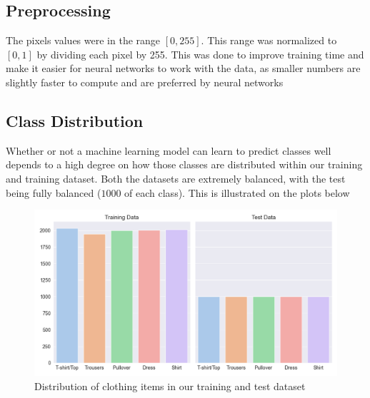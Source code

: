 \subsection{Preprocessing}\label{subsec:preprocessing}
The pixels values were in the range $[0, 255]$.
This range was normalized to $[0, 1]$ by dividing each pixel by 255.
This was done to improve training time and make it easier for neural networks to work with the data, as smaller numbers are slightly faster to compute and are preferred by neural networks


\subsection{Class Distribution}\label{subsec:class-distribution}
Whether or not a machine learning model can learn to predict classes well depends to a high degree on how those classes are distributed within our training and training dataset.
Both the datasets are extremely balanced, with the test being fully balanced ($1000$ of each class).
This is illustrated on the plots below

\begin{figure}[ht]
\centering
\includegraphics[scale=0.45]{figures_for_report/class_distribution}
\captionsetup{justification=centering,margin=2cm}
\caption{Distribution of clothing items in our training and test dataset}\label{fig:figure2}
\end{figure}

